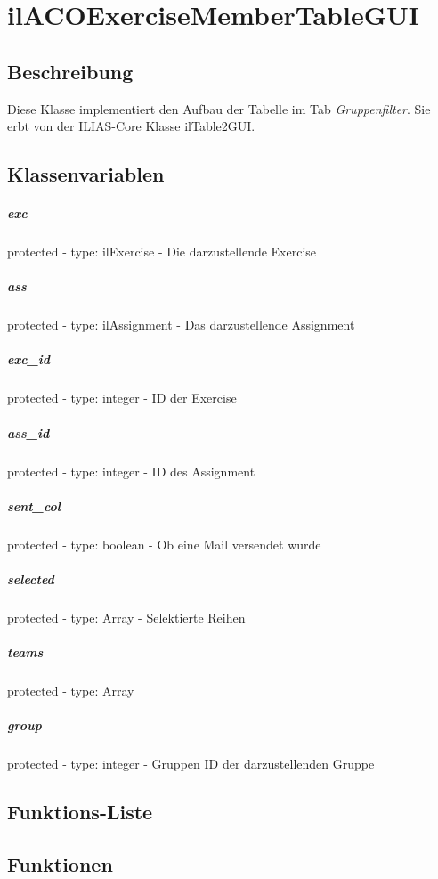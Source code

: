 \section{ilACOExerciseMemberTableGUI}

\subsection*{Beschreibung}
Diese Klasse implementiert den Aufbau der Tabelle im Tab \textit{Gruppenfilter}. 
Sie erbt von der ILIAS-Core Klasse ilTable2GUI.

\subsection*{Klassenvariablen}
\subparagraph{exc}
protected - type: ilExercise - Die darzustellende Exercise
\subparagraph{ass}
protected - type: ilAssignment - Das darzustellende Assignment
\subparagraph{exc\_id}
protected - type: integer - ID der Exercise
\subparagraph{ass\_id}
protected - type: integer - ID des Assignment
\subparagraph{sent\_col}
protected - type: boolean - Ob eine Mail versendet wurde
\subparagraph{selected}
protected - type: Array - Selektierte Reihen
\subparagraph{teams}
protected - type: Array
\subparagraph{group}
protected - type: integer - Gruppen ID der darzustellenden Gruppe


\subsection*{Funktions-Liste}

\subparagraph{}
\subparagraph{}
\subparagraph{}
\subparagraph{}

\subsection*{Funktionen}

